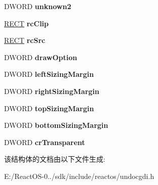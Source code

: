 \begin{DoxyCompactItemize}
D\+W\+O\+RD {\bfseries unknown2}
\item 
\mbox{\label{struct_g_d_i___d_r_a_w___s_t_r_e_a_m___t_a_g_a511c3f85eebfabf79d903cfae89af746}} 
\hyperlink{structtag_r_e_c_t}{R\+E\+CT} {\bfseries rc\+Clip}
\item 
\mbox{\label{struct_g_d_i___d_r_a_w___s_t_r_e_a_m___t_a_g_a4322353f8a13dd31a35ebdda7fbe45f5}} 
\hyperlink{structtag_r_e_c_t}{R\+E\+CT} {\bfseries rc\+Src}
\item 
\mbox{\label{struct_g_d_i___d_r_a_w___s_t_r_e_a_m___t_a_g_ab20ab3b7a3063200b7eb8ea3cebdfb30}} 
D\+W\+O\+RD {\bfseries draw\+Option}
\item 
\mbox{\label{struct_g_d_i___d_r_a_w___s_t_r_e_a_m___t_a_g_a6a8323055720789e243da84b540d18fe}} 
D\+W\+O\+RD {\bfseries left\+Sizing\+Margin}
\item 
\mbox{\label{struct_g_d_i___d_r_a_w___s_t_r_e_a_m___t_a_g_aae41638882916be4a0c930ecc1f699a7}} 
D\+W\+O\+RD {\bfseries right\+Sizing\+Margin}
\item 
\mbox{\label{struct_g_d_i___d_r_a_w___s_t_r_e_a_m___t_a_g_aaff3c4f5b71637221adfaeac34c8db20}} 
D\+W\+O\+RD {\bfseries top\+Sizing\+Margin}
\item 
\mbox{\label{struct_g_d_i___d_r_a_w___s_t_r_e_a_m___t_a_g_ae0d275c90e1240029f2d28b216b095d7}} 
D\+W\+O\+RD {\bfseries bottom\+Sizing\+Margin}
\item 
\mbox{\label{struct_g_d_i___d_r_a_w___s_t_r_e_a_m___t_a_g_afc5387bd60d993531af0d177ca6f1969}} 
D\+W\+O\+RD {\bfseries cr\+Transparent}
\end{DoxyCompactItemize}


该结构体的文档由以下文件生成\+:\begin{DoxyCompactItemize}
\item 
E\+:/\+React\+O\+S-\/0../sdk/include/reactos/undocgdi.\+h\end{DoxyCompactItemize}
